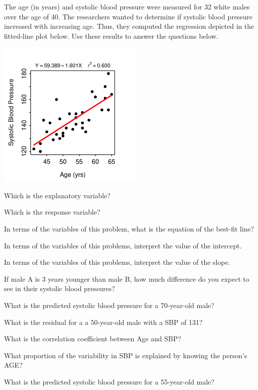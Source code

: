 \documentclass[10pt,openany]{book}\usepackage[]{graphicx}\usepackage[]{color}
\begin{document}
\begin{exsection}
  \item \label{revex:RegBP} The age (in years) and systolic blood pressure were measured for 32 white males over the age of 40.  The researchers wanted to determine if systolic blood pressure increased with increasing age.  Thus, they computed the regression depicted in the fitted-line plot below.  Use these results to answer the questions below.  

\begin{center}
  \includegraphics[width=2.8in]{Figs/SBPFLP-1}
\end{center}
    \begin{Enumerate}
      \item Which is the explanatory variable?
      \item Which is the response variable?
      \item In terms of the variables of this problem, what is the equation of the best-fit line?
      \item In terms of the variables of this problems, interpret the value of the intercept.
      \item In terms of the variables of this problems, interpret the value of the slope.
      \item If male A is 3 years younger than male B, how much difference do you expect to see in their systolic blood pressures?
      \item What is the predicted systolic blood pressure for a 70-year-old male?
      \item What is the residual for a a 50-year-old male with a SBP of 131?
      \item What is the correlation coefficient between Age and SBP?
      \item What proportion of the variability in SBP is explained by knowing the person's AGE?
      \item What is the predicted systolic blood pressure for a 55-year-old male?
    \end{Enumerate}


\end{exsection}
\end{document}
